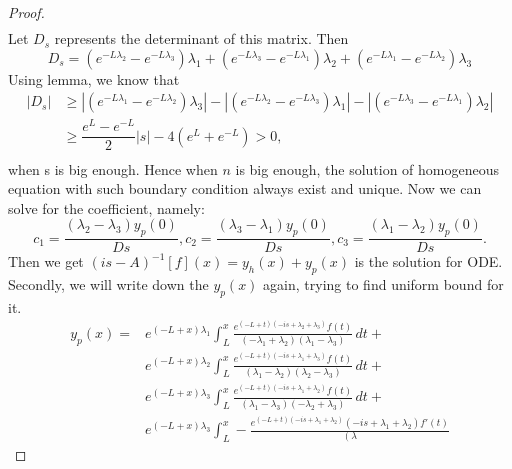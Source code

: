 \documentclass[a4paper,draft]{amsproc}
\theoremstyle{plain}
\theoremstyle{definition}
\theoremstyle{remark}
\numberwithin{equation}{section}
\begin{document}
\begin{proof}
\begin{equation*}
\begin{split}
\end{split}
\end{equation*}
Let $D_s$ represents the determinant of this matrix. 
Then
\begin{equation*}
D_s= (e^{-L \lambda _2}-e^{-L \lambda _3}) \lambda _1+(e^{-L \lambda _3}-e^{-L \lambda _1}) \lambda _2+(e^{-L \lambda_1}-e^{-L \lambda _2}) \lambda _3
\end{equation*}
Using lemma, we know that \\
\begin{equation*} 
\begin{split}
 |D_s| &\geq |(e^{-L \lambda_1}-e^{-L \lambda _2}) \lambda _3|-| (e^{-L \lambda _2}-e^{-L \lambda _3}) \lambda _1|-|(e^{-L \lambda _3}-e^{-L \lambda _1}) \lambda _2|\\
 &\geq \dfrac{e^L-e^{-L}}{2}|s|-4(e^L+e^{-L})>0,\\
\end{split}
\end{equation*}
 when s is big enough. Hence when $n$ is big enough, the solution of homogeneous equation with such boundary condition always exist and unique. Now we can solve for the coefficient, namely:\\
 \begin{displaymath}
c_1=\frac{(\lambda_2-\lambda_3)y_p(0)}{Ds},c_2=\frac{(\lambda_3-\lambda_1)y_p(0)}{Ds},c_3=\frac{(\lambda_1-\lambda_2)y_p(0)}{Ds}.
\end{displaymath}
Then we get $(is-A)^{-1}[f](x)=y_h(x)+y_p(x)$ is the solution for ODE.\\
Secondly, we will write down the $y_p(x)$ again, trying to find uniform bound for it.
\begin{displaymath}
\begin{aligned}
y_p(x)=&e^{(-L+x) \lambda
		_1} \int_L^x \frac{e^{(-L+t) \left(-i s+\lambda _2+\lambda _3\right)} f(t)}{\left(-\lambda _1+\lambda _2\right) \left(\lambda _1-\lambda _3\right)}\, dt+\\
&{e^{(-L+x) \lambda _2} \int_L^x \frac{e^{(-L+t) \left(-i s+\lambda _1+\lambda _3\right)} f(t)}{\left(\lambda _1-\lambda _2\right) \left(\lambda
		_2-\lambda _3\right)} \, dt+}\\
	&{e^{(-L+x) \lambda _3} \int_L^x \frac{e^{(-L+t) \left(-i s+\lambda _1+\lambda _2\right)} f(t)}{\left(\lambda _1-\lambda
		_3\right) \left(-\lambda _2+\lambda _3\right)} \, dt+}\\
&{e^{(-L+x) \lambda _3} \int_L^x -\frac{e^{(-L+t) \left(-i s+\lambda _1+\lambda _2\right)} \left(-i s+\lambda _1+\lambda _2\right) f'(t)}{\left(\lambda
}}
\end{aligned}
\end{displaymath}
\end{proof}
\end{document}

